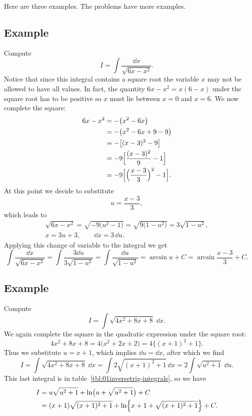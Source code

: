 Here are three examples.  The problems have more examples.

\subsection{Example} Compute %
\[
I = \int \frac{\dd x}{\sqrt{6x-x^2}}.
\]
Notice that since this integral contains a square root the variable $x$ may not
be allowed to have all values.  
In fact, the quantity $6x-x^2 = x(6-x)$ under the square root has to be positive
so $x$ must lie between $x=0$ and $x=6$.  We now complete the square:
\begin{align*}
  6x-x^2
  &= -\bigl(x^2-6x\bigr) \\
  &= -\bigl(x^2-6x+9-9\bigr) \\
  &= - \bigl[(x-3)^2 - 9\bigr] \\
  &= - 9\Bigl[\frac{(x-3)^2}{9} - 1\Bigr] \\
  &= -9 \Bigl[\Bigl(\frac{x-3}{3}\Bigr)^2 - 1\Bigr].
\end{align*}
At this point we decide to substitute
\[
u = \frac{x-3}{3},
\]
which leads to
\begin{gather*}
  \sqrt{6x-x^2} = \sqrt{-9 \bigl(u^2 -1\bigr)} = \sqrt{9 \bigl(1 - u^2\bigr)}
  = 3 \sqrt{1-u^2},\\
  x = 3u+3, \qquad \dd x = 3\,\dd u.
\end{gather*}
Applying this change of variable to the integral we get
\[
\int \frac{\dd x}{\sqrt{6x-x^2}} = \int \frac{3 \dd u}{3\sqrt{1-u^2}} = \int
\frac{\dd u}{\sqrt{1-u^2}} = \arcsin u +C = \arcsin \frac{x-3}{3} +C.
\]
\subsection{Example} Compute %
\[
I= \int \sqrt{4x^2+8x+8}\; \dd x.
\]
We again complete the square in the quadratic expression under the square root:
\[
4x^2 + 8x + 8 = 4\bigl( x^2 + 2x + 2 \bigr) = 4\bigl\{ (x+1)^2 +1 \bigr\} .
\]
Thus we substitute $u=x+1$, which implies $\dd u = \dd x$, after which we find
\[
I= \int \sqrt{4x^2+8x+8}\; \dd x = \int 2\sqrt{(x+1)^2 +1} \, \dd x = 2\int
\sqrt{u^2 +1} \; \dd u.
\]
This last integral is in table~\ref{tbl:01inversetrig-integrals}, so we have
\begin{align*}
  I &= u\sqrt{u^2+1} + \ln\bigl(u+\sqrt{u^2+1}\bigr) + C \\
  &= (x+1) \sqrt{(x+1)^2 + 1} + \ln \Bigl\{x+1 + \sqrt{(x+1)^2 +1}\Bigr\} + C.
\end{align*}

